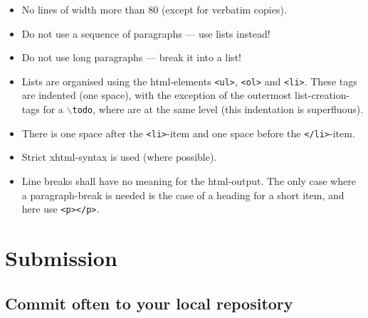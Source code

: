 \documentclass{book}
\begin{document}
\begin{itemize}
\item No lines of width more than 80 (except for verbatim copies).
\item Do not use a sequence of paragraphs --- use lists instead!
\item Do not use long paragraphs --- break it into a list!
\item Lists are organised using the html-elements \texttt{<ul>}, \texttt{<ol>} and \texttt{<li>}. These tags are indented (one space), with the exception of the outermost list-creation-tags for a \texttt{$\backslash$todo}, where are at the same level (this indentation is superfluous).
\item There is one space after the \texttt{<li>}-item and one space before the \texttt{</li>}-item.
\item Strict xhtml-syntax is used (where possible).
\item Line breaks shall have no meaning for the html-output. The only case where a paragraph-break is needed is the case of a heading for a short item, and here use \texttt{<p></p>}.
\end{itemize}
 





\chapter{Submission}
\label{cha:Submission}

\section{Commit often to your local repository}
\label{sec:Submitoften}
\end{document}
